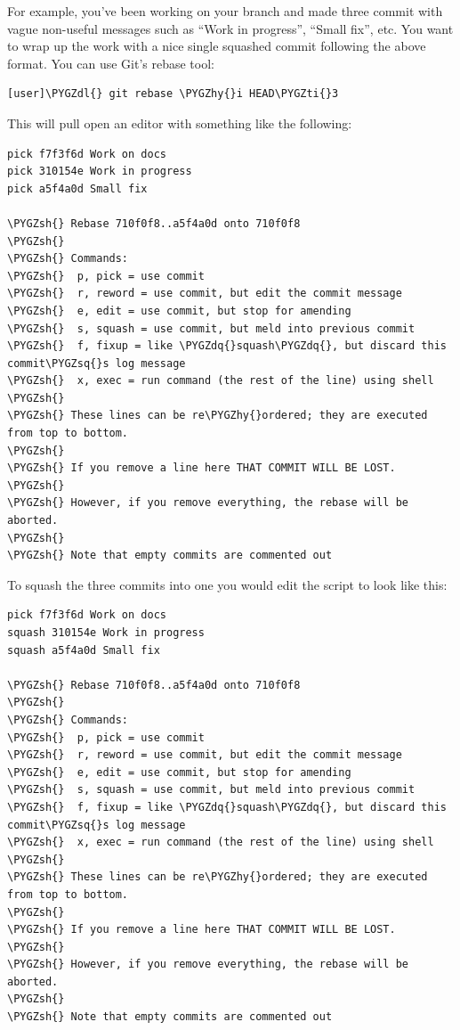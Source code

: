 \documentclass[letterpaper,10pt,english]{sphinxmanual}
\def\PYGZsh{\char`\#}
\def\PYGZdl{\char`\$}
\def\PYGZhy{\char`\-}
\def\PYGZsq{\char`\'}
\def\PYGZdq{\char`\"}
\def\PYGZti{\char`\~}
\renewcommand\PYGZsq{\textquotesingle}
\begin{document}
For example, you've been working on your branch and made three commit
with vague non-useful messages such as ``Work in progress'', ``Small
fix'', etc. You want to wrap up the work with a nice single squashed
commit following the above format. You can use Git's rebase tool:

\begin{Verbatim}[commandchars=\\\{\}]
[user]\PYGZdl{} git rebase \PYGZhy{}i HEAD\PYGZti{}3
\end{Verbatim}

This will pull open an editor with something like the following:

\begin{Verbatim}[commandchars=\\\{\}]
pick f7f3f6d Work on docs
pick 310154e Work in progress
pick a5f4a0d Small fix

\PYGZsh{} Rebase 710f0f8..a5f4a0d onto 710f0f8
\PYGZsh{}
\PYGZsh{} Commands:
\PYGZsh{}  p, pick = use commit
\PYGZsh{}  r, reword = use commit, but edit the commit message
\PYGZsh{}  e, edit = use commit, but stop for amending
\PYGZsh{}  s, squash = use commit, but meld into previous commit
\PYGZsh{}  f, fixup = like \PYGZdq{}squash\PYGZdq{}, but discard this commit\PYGZsq{}s log message
\PYGZsh{}  x, exec = run command (the rest of the line) using shell
\PYGZsh{}
\PYGZsh{} These lines can be re\PYGZhy{}ordered; they are executed from top to bottom.
\PYGZsh{}
\PYGZsh{} If you remove a line here THAT COMMIT WILL BE LOST.
\PYGZsh{}
\PYGZsh{} However, if you remove everything, the rebase will be aborted.
\PYGZsh{}
\PYGZsh{} Note that empty commits are commented out
\end{Verbatim}

To squash the three commits into one you would edit the script to look
like this:

\begin{Verbatim}[commandchars=\\\{\}]
pick f7f3f6d Work on docs
squash 310154e Work in progress
squash a5f4a0d Small fix

\PYGZsh{} Rebase 710f0f8..a5f4a0d onto 710f0f8
\PYGZsh{}
\PYGZsh{} Commands:
\PYGZsh{}  p, pick = use commit
\PYGZsh{}  r, reword = use commit, but edit the commit message
\PYGZsh{}  e, edit = use commit, but stop for amending
\PYGZsh{}  s, squash = use commit, but meld into previous commit
\PYGZsh{}  f, fixup = like \PYGZdq{}squash\PYGZdq{}, but discard this commit\PYGZsq{}s log message
\PYGZsh{}  x, exec = run command (the rest of the line) using shell
\PYGZsh{}
\PYGZsh{} These lines can be re\PYGZhy{}ordered; they are executed from top to bottom.
\PYGZsh{}
\PYGZsh{} If you remove a line here THAT COMMIT WILL BE LOST.
\PYGZsh{}
\PYGZsh{} However, if you remove everything, the rebase will be aborted.
\PYGZsh{}
\PYGZsh{} Note that empty commits are commented out
\end{Verbatim}
\end{document}
